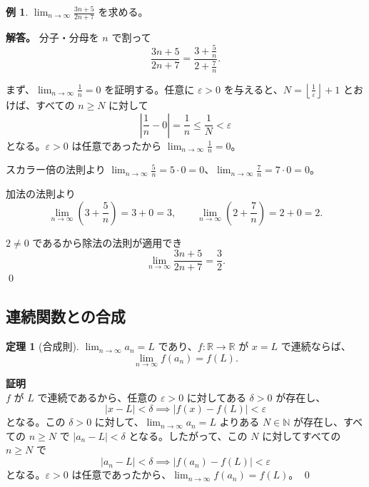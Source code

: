 \documentclass[11pt,a4paper]{jsarticle}
\theoremstyle{definition}
\newtheorem{theorem}{定理}[section]
\newtheorem{example}{例}[section]
\newcommand{\N}{\mathbb{N}}
\newcommand{\R}{\mathbb{R}}
\newcommand{\eps}{\varepsilon}
\begin{document}
\begin{examplebox}
\begin{example}\label{ex:rational}
$\displaystyle\lim_{n \to \infty} \frac{3n+5}{2n+7}$ を求める。

\textbf{解答。}
分子・分母を $n$ で割って
\[
\frac{3n+5}{2n+7} = \frac{3 + \frac{5}{n}}{2 + \frac{7}{n}}.
\]

まず、$\lim_{n \to \infty} \frac{1}{n} = 0$ を証明する。任意に $\eps > 0$ を与えると、$N = \left\lfloor\frac{1}{\eps}\right\rfloor + 1$ とおけば、すべての $n \geq N$ に対して
\[
\left|\frac{1}{n} - 0\right| = \frac{1}{n} \leq \frac{1}{N} < \eps
\]
となる。$\eps > 0$ は任意であったから $\lim_{n \to \infty} \frac{1}{n} = 0$。

スカラー倍の法則より $\lim_{n \to \infty} \frac{5}{n} = 5 \cdot 0 = 0$、$\lim_{n \to \infty} \frac{7}{n} = 7 \cdot 0 = 0$。

加法の法則より
\[
\lim_{n \to \infty} \left(3 + \frac{5}{n}\right) = 3 + 0 = 3,
\qquad
\lim_{n \to \infty} \left(2 + \frac{7}{n}\right) = 2 + 0 = 2.
\]

$2 \neq 0$ であるから除法の法則が適用でき
\[
\lim_{n \to \infty} \frac{3n+5}{2n+7} = \frac{3}{2}.
\]
\qed
\end{example}
\end{examplebox}

\subsection{連続関数との合成}

\begin{theorembox}[定理：連続関数との合成]
\begin{theorem}[合成則]\label{thm:composition}
$\lim_{n \to \infty} a_n = L$ であり、$f: \R \to \R$ が $x = L$ で連続ならば、
\[
\lim_{n \to \infty} f(a_n) = f(L).
\]
\end{theorem}
\end{theorembox}

\begin{proofbox}
\textbf{証明}\ \\
\noindent
$f$ が $L$ で連続であるから、任意の $\eps > 0$ に対してある $\delta > 0$ が存在し、
\[
|x - L| < \delta \implies |f(x) - f(L)| < \eps
\]
となる。この $\delta > 0$ に対して、$\lim_{n \to \infty} a_n = L$ よりある $N \in \N$ が存在し、すべての $n \geq N$ で $|a_n - L| < \delta$ となる。したがって、この $N$ に対してすべての $n \geq N$ で
\[
|a_n - L| < \delta \implies |f(a_n) - f(L)| < \eps
\]
となる。$\eps > 0$ は任意であったから、$\lim_{n \to \infty} f(a_n) = f(L)$。 \qed
\end{proofbox}
\end{document}
